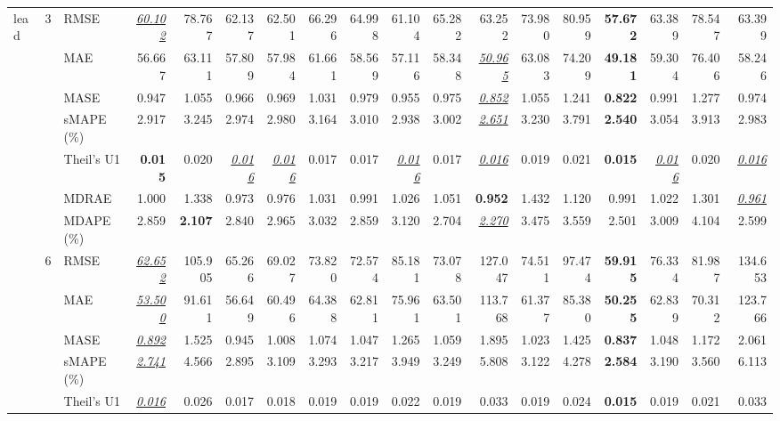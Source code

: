\begin{table}[!htbp]
{\begin{tabular}{lllrrrrrrrrrrrrrrr}
\midrule
lead & 3 & RMSE & \underline{\textit{60.102}} & 78.767 & 62.137 & 62.501 & 66.296 & 64.998 & 61.104 & 65.282 & 63.252 & 73.980 & 80.959 & \textbf{57.672} & 63.389 & 78.547 & 63.399 \\
 &  & MAE & 56.667 & 63.111 & 57.809 & 57.984 & 61.661 & 58.569 & 57.116 & 58.348 & \underline{\textit{50.965}} & 63.083 & 74.209 & \textbf{49.181} & 59.304 & 76.406 & 58.246 \\
 &  & MASE & 0.947 & 1.055 & 0.966 & 0.969 & 1.031 & 0.979 & 0.955 & 0.975 & \underline{\textit{0.852}} & 1.055 & 1.241 & \textbf{0.822} & 0.991 & 1.277 & 0.974 \\
 &  & sMAPE (\%) & 2.917 & 3.245 & 2.974 & 2.980 & 3.164 & 3.010 & 2.938 & 3.002 & \underline{\textit{2.651}} & 3.230 & 3.791 & \textbf{2.540} & 3.054 & 3.913 & 2.983 \\
 &  & Theil's U1 & \textbf{0.015} & 0.020 & \underline{\textit{0.016}} & \underline{\textit{0.016}} & 0.017 & 0.017 & \underline{\textit{0.016}} & 0.017 & \underline{\textit{0.016}} & 0.019 & 0.021 & \textbf{0.015} & \underline{\textit{0.016}} & 0.020 & \underline{\textit{0.016}} \\
 &  & MDRAE & 1.000 & 1.338 & 0.973 & 0.976 & 1.031 & 0.991 & 1.026 & 1.051 & \textbf{0.952} & 1.432 & 1.120 & 0.991 & 1.022 & 1.301 & \underline{\textit{0.961}} \\
 &  & MDAPE (\%) & 2.859 & \textbf{2.107} & 2.840 & 2.965 & 3.032 & 2.859 & 3.120 & 2.704 & \underline{\textit{2.270}} & 3.475 & 3.559 & 2.501 & 3.009 & 4.104 & 2.599 \\
\cmidrule(lr){2-18}
 & 6 & RMSE & \underline{\textit{62.652}} & 105.905 & 65.266 & 69.027 & 73.820 & 72.574 & 85.181 & 73.078 & 127.047 & 74.511 & 97.474 & \textbf{59.915} & 76.334 & 81.987 & 134.653 \\
 &  & MAE & \underline{\textit{53.500}} & 91.611 & 56.649 & 60.496 & 64.388 & 62.811 & 75.961 & 63.501 & 113.768 & 61.377 & 85.380 & \textbf{50.255} & 62.839 & 70.312 & 123.766 \\
 &  & MASE & \underline{\textit{0.892}} & 1.525 & 0.945 & 1.008 & 1.074 & 1.047 & 1.265 & 1.059 & 1.895 & 1.023 & 1.425 & \textbf{0.837} & 1.048 & 1.172 & 2.061 \\
 &  & sMAPE (\%) & \underline{\textit{2.741}} & 4.566 & 2.895 & 3.109 & 3.293 & 3.217 & 3.949 & 3.249 & 5.808 & 3.122 & 4.278 & \textbf{2.584} & 3.190 & 3.560 & 6.113 \\
 &  & Theil's U1 & \underline{\textit{0.016}} & 0.026 & 0.017 & 0.018 & 0.019 & 0.019 & 0.022 & 0.019 & 0.033 & 0.019 & 0.024 & \textbf{0.015} & 0.019 & 0.021 & 0.033 \\

\end{tabular}}
\end{table}
